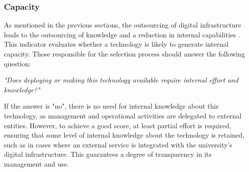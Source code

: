 \subsubsection{Capacity}
As mentioned in the previous sections, the outsourcing of digital infrastructure leads to the outsourcing of knowledge and a reduction in internal capabilities \cite{angeli_conceptualising_2022}. This indicator evaluates whether a technology is likely to generate internal capacity. Those responsible for the selection process should answer the following question:

\begin{center}
    \textit{"Does deploying or making this technology available require internal effort and knowledge?"}
\end{center}

\noindent
If the answer is "no", there is no need for internal knowledge about this technology, as management and operational activities are delegated to external entities. However, to achieve a good score, at least partial effort is required, ensuring that some level of internal knowledge about the technology is retained, such as in cases where an external service is integrated with the university's digital infrastructure. This guarantees a degree of transparency in its management and use.

\bigskip

